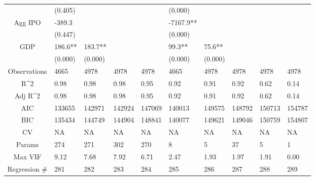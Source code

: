 \documentclass{article}
\begin{document}
\begin{table}[H]
\begin{tabular}{|clllllllll|}
   & (0.405) &  &  &  & (0.000) &  &  &  &  \\ 
  Agg IPO & -389.3 &  &  &  & -7167.9** &  &  &  &  \\ 
   & (0.447) &  &  &  & (0.000) &  &  &  &  \\ 
  GDP & 186.6** & 183.7** &  &  & 99.3** & 75.6** &  &  &  \\ 
   & (0.000) & (0.000) &  &  & (0.000) & (0.000) &  &  &  \\ 
  \hline 
 Observations & 4665 & 4978 & 4978 & 4978 & 4665 & 4978 & 4978 & 4978 & 4978 \\ 
  R^2 & 0.98 & 0.98 & 0.98 & 0.95 & 0.92 & 0.91 & 0.92 & 0.62 & 0.14 \\ 
  Adj R^2 & 0.98 & 0.98 & 0.98 & 0.95 & 0.92 & 0.91 & 0.92 & 0.62 & 0.14 \\ 
  AIC & 133655 & 142971 & 142924 & 147069 & 140013 & 149575 & 148792 & 150713 & 154787 \\ 
  BIC & 135434 & 144749 & 144904 & 148841 & 140077 & 149621 & 149046 & 150759 & 154807 \\ 
  CV & NA & NA & NA & NA & NA & NA & NA & NA & NA \\ 
  Params & 274 & 271 & 302 & 270 & 8 & 5 & 37 & 5 & 1 \\ 
  Max VIF & 9.12 & 7.68 & 7.92 & 6.71 & 2.47 & 1.93 & 1.97 & 1.91 & 0.00 \\ 
  Regression \# & 281 & 282 & 283 & 284 & 285 & 286 & 287 & 288 & 289 \\ 
   \hline
\end{tabular}
 
\end{table}
\end{document}
